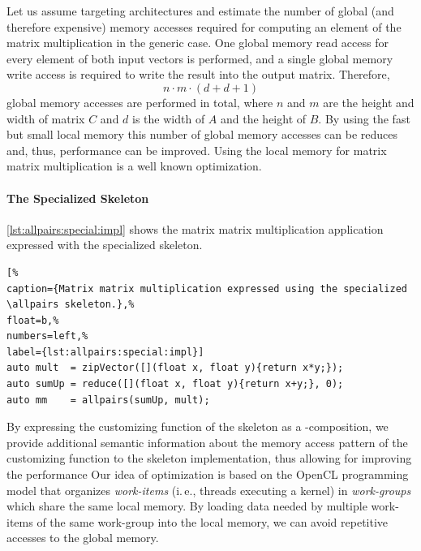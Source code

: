 Let us assume targeting \GPU architectures and estimate the number of global (and therefore expensive) memory accesses required for computing an element of the matrix multiplication in the generic case.
One global memory read access for every element of both input vectors is performed, and a single global memory write access is required to write the result into the output matrix.
Therefore, 
\begin{equation}
  n\cdot m\cdot (d + d + 1)
  \label{eq:mm:accesses}
\end{equation}
global memory accesses are performed in total, where $n$ and $m$ are the height and width of matrix $C$ and $d$ is the width of $A$ and the height of $B$.
By using the fast but small local memory this number of global memory accesses can be reduces and, thus, performance can be improved.
Using the local memory for matrix matrix multiplication is a well known optimization.

\paragraph{The Specialized \allpairs Skeleton}
\autoref{lst:allpairs:special:impl} shows the matrix matrix multiplication application expressed with the specialized \allpairs skeleton.
\begin{lstlisting}[%                                                             
caption={Matrix matrix multiplication expressed using the specialized \allpairs skeleton.},%
float=b,%                                                                       
numbers=left,%
label={lst:allpairs:special:impl}]
auto mult  = zipVector([](float x, float y){return x*y;});
auto sumUp = reduce([](float x, float y){return x+y;}, 0);
auto mm    = allpairs(sumUp, mult);
\end{lstlisting}
%
By expressing the customizing function of the \allpairs skeleton as a \zip-\reduce composition, we provide additional semantic information about the memory access pattern of the customizing function to the skeleton implementation, thus allowing for improving the performance
Our idea of optimization is based on the OpenCL programming model that organizes \emph{work-items} (i.\,e., threads executing a kernel) in \emph{work-groups} which share the same \GPU local memory.
By loading data needed by multiple work-items of the same work-group into the local memory, we can avoid repetitive accesses to the global memory.

